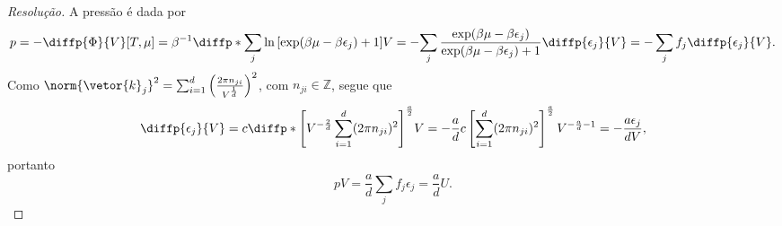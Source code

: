 \begin{proof}[Resolução]
    A pressão é dada por
    \begin{equation*}
        p = -\diffp{\Phi}{V}[T,\mu] = \beta^{-1}\diffp*{\sum_{j} \ln\left[\exp(\beta \mu - \beta \epsilon_j) + 1\right]}{V}
        = -{\sum_{j}\frac{\exp(\beta \mu - \beta \epsilon_j)}{\exp(\beta \mu - \beta \epsilon_j) + 1} \diffp{\epsilon_j}{V}} = -\sum_{j} f_j \diffp{\epsilon_j}{V}.
    \end{equation*}
    Como \(\norm{\vetor{k}_j}^2 = \sum_{i=1}^d \left(\frac{2\pi n_{ji}}{V^{\frac1d}}\right)^2\), com \(n_{ji} \in \mathbb{Z}\), segue que
    \begin{equation*}
        \diffp{\epsilon_j}{V} = c \diffp*{\left[V^{-\frac2d}\sum_{i = 1}^d (2\pi n_{ji})^2\right]^{\frac{a}{2}}}{V} = -\frac{a}{d}c \left[\sum_{i=1}^d(2\pi n_{ji})^2\right]^{\frac{a}{2}} V^{-\frac{a}{d} - 1} = - \frac{a \epsilon_j}{d V},
    \end{equation*}
    portanto
    \begin{equation*}
        p V = \frac{a}{d} \sum_j f_j \epsilon_j = \frac{a}{d} U.
    \end{equation*}


\end{proof}
